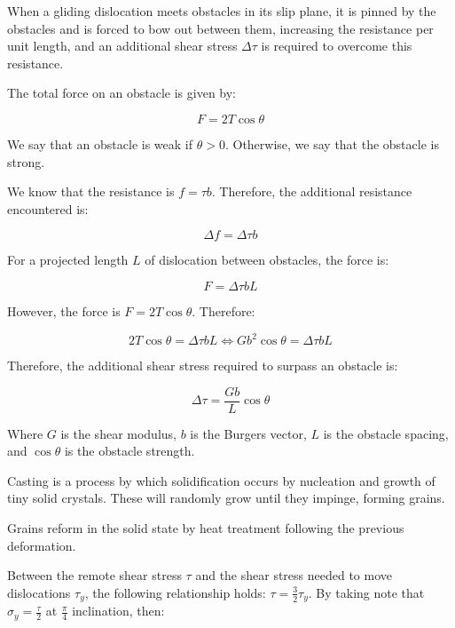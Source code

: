 \documentclass{article}
\begin{document}
\begin{proposition}
    When a gliding dislocation meets obstacles in its slip plane, it is pinned by the obstacles and is forced to bow out between them, increasing the resistance per unit length, and an additional shear stress $\Delta\tau$ is required to overcome this resistance.

    The total force on an obstacle is given by:

    \[ F = 2T\cos{\theta} \]

    We say that an obstacle is weak if $\theta > 0$. Otherwise, we say that the obstacle is strong.

    We know that the resistance is $f = \tau b$. Therefore, the additional resistance encountered is:

    \[ \Delta f = \Delta \tau b \]

    For a projected length $L$ of dislocation between obstacles, the force is:

    \[ F = \Delta\tau bL \]

    However, the force is $F = 2T\cos{\theta}$. Therefore:

    \[ 2T\cos{\theta} = \Delta\tau bL \iff Gb^2\cos{\theta} = \Delta\tau bL \]

    Therefore, the additional shear stress required to surpass an obstacle is:

    \[ \Delta\tau = \frac{Gb}{L}\cos{\theta} \]

    Where $G$ is the shear modulus, $b$ is the Burgers vector, $L$ is the obstacle spacing, and $\cos{\theta}$ is the obstacle strength.
 \end{proposition}

\begin{definition}[Casting]
    Casting is a process by which solidification occurs by nucleation and growth of tiny solid crystals. These will randomly grow until they impinge, forming grains.
\end{definition}

\begin{definition}[Re-crystallisation]
    Grains reform in the solid state by heat treatment following the previous deformation.
\end{definition}

Between the remote shear stress $\tau$ and the shear stress needed to move dislocations $\tau_y$, the following relationship holds: $\tau = \frac{3}{2}\tau_y$. By taking note that $\sigma_y = \frac{\tau}{2}$ at $\frac{\pi}{4}$ inclination, then:
\end{document}
